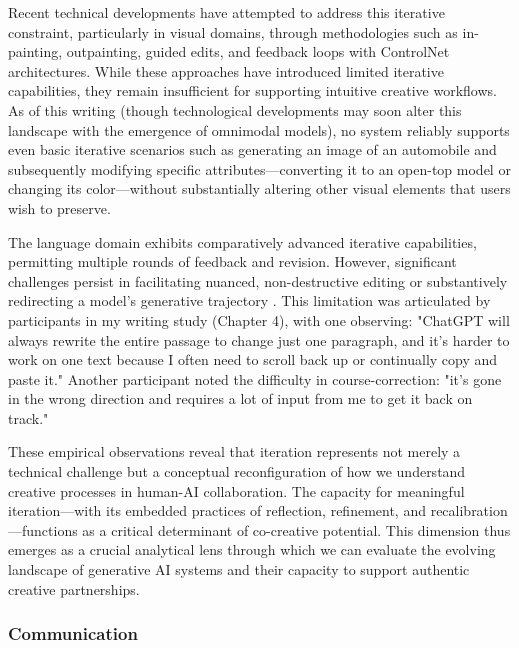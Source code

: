 Recent technical developments have attempted to address this iterative constraint, particularly in visual domains, through methodologies such as in-painting, outpainting, guided edits, and feedback loops with ControlNet architectures. While these approaches have introduced limited iterative capabilities, they remain insufficient for supporting intuitive creative workflows. As of this writing (though technological developments may soon alter this landscape with the emergence of omnimodal models), no system reliably supports even basic iterative scenarios such as generating an image of an automobile and subsequently modifying specific attributes—converting it to an open-top model or changing its color—without substantially altering other visual elements that users wish to preserve.

The language domain exhibits comparatively advanced iterative capabilities, permitting multiple rounds of feedback and revision. However, significant challenges persist in facilitating nuanced, non-destructive editing or substantively redirecting a model's generative trajectory \cite{Bown2024-yx}. This limitation was articulated by participants in my writing study (Chapter 4), with one observing: "ChatGPT will always rewrite the entire passage to change just one paragraph, and it's harder to work on one text because I often need to scroll back up or continually copy and paste it." Another participant noted the difficulty in course-correction: "it's gone in the wrong direction and requires a lot of input from me to get it back on track."

These empirical observations reveal that iteration represents not merely a technical challenge but a conceptual reconfiguration of how we understand creative processes in human-AI collaboration. The capacity for meaningful iteration—with its embedded practices of reflection, refinement, and recalibration—functions as a critical determinant of co-creative potential. This dimension thus emerges as a crucial analytical lens through which we can evaluate the evolving landscape of generative AI systems and their capacity to support authentic creative partnerships.

\subsubsection{Communication}

